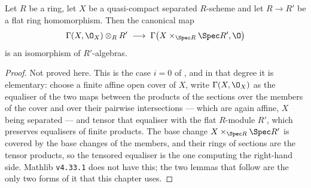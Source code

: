 \begin{proposition}
\label{prop:cube-global-sections-flat-base-change}
Let $R$ be a ring, let $X$ be a quasi-compact separated $R$-scheme and let
$R\to R'$ be a flat ring homomorphism.  Then the canonical map
\[
  \Gamma(X,\O_X)\otimes_RR'\;\longrightarrow\;
  \Gamma\bigl(X\times_{\Spec R}\Spec R',\O\bigr)
\]
is an isomorphism of $R'$-algebras.
\end{proposition}
\begin{proof}
Not proved here.  This is the case $i=0$ of , and in that
degree it is elementary: choose a finite affine open cover of $X$, write
$\Gamma(X,\O_X)$ as the equaliser of the two maps between the products of the
sections over the members of the cover and over their pairwise intersections
--- which are again affine, $X$ being separated --- and tensor that equaliser
with the flat $R$-module $R'$, which preserves equalisers of finite
products.  The base change
$X\times_{\Spec R}\Spec R'$ is covered by the base changes of the members,
and their rings of sections are the tensor products, so the tensored equaliser
is the one computing the right-hand side.  Mathlib \texttt{v4.33.1} does not
have this; the two lemmas that follow are the only two forms of it that this
chapter uses.
\end{proof}

